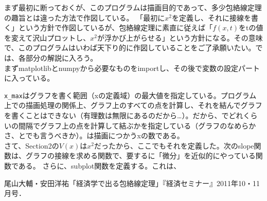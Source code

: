 \documentclass[11pt,a4j,fleqn]{jarticle}
\begin{document}
まず最初に断っておくが、このプログラムは描画目的であって、多少包絡線定理の趣旨とは違った方法で作図している。
「最初に$x^2$を定義し、それに接線を書く」という方針で作図しているが、包絡線定理に素直に従えば「$f(x,t)$をtの値を変えて沢山プロットし、$x^2$が浮かび上がらせる」という方針になる。その意味で、このプログラムはいわば天下り的に作図していることをご了承願いたい。では、各部分の解説に入ろう。\\


まずmatplotlibとnumpyから必要なものをimportし、その後で変数の設定パートに入っている。

\verb!x_max!はグラフを書く範囲（xの定義域）の最大値を指定している。プログラム上での描画処理の関係上、グラフ上のすべての点を計算し、それを結んでグラフを書くことはできない（有理数は無限にあるのだから…）。だから、でどれくらいの間隔でグラフ上の点を計算して結ぶかを指定している（グラフのなめらかさ、とでも言うべきか）。は描画につかうxの数である。\\

さて、Section2の$V(x)$は$x^2$だったから、ここでもそれを定義した。次のslope関数は、グラフの接線を求める関数で、要するに「微分」を近似的にやっている関数である。
さらに、subplot関数を定義する。これは、





\begin{thebibliography}{0}
尾山大輔・安田洋祐「経済学で出る包絡線定理」『経済セミナー』2011年10・11月号．
\end{thebibliography}
\end{document}
